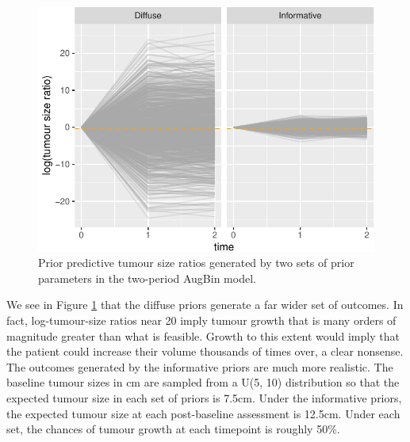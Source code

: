 \documentclass[article]{jss}
\begin{document}
\begin{CodeChunk}
\begin{figure}

{\centering \includegraphics{trialr_files/figure-latex/augbin_prior_pred_tumour-1} 

}

\caption[Prior predictive tumour size ratios generated by two sets of prior parameters in the two-period AugBin model]{Prior predictive tumour size ratios generated by two sets of prior parameters in the two-period AugBin model.}\label{fig:augbin_prior_pred_tumour}
\end{figure}
\end{CodeChunk}

We see in Figure \ref{fig:augbin_prior_pred_tumour} that the diffuse
priors generate a far wider set of outcomes. In fact, log-tumour-size
ratios near 20 imply tumour growth that is many orders of magnitude
greater than what is feasible. Growth to this extent would imply that
the patient could increase their volume thousands of times over, a clear
nonsense. The outcomes generated by the informative priors are much more
realistic. The baseline tumour sizes in cm are sampled from a U(5, 10)
distribution so that the expected tumour size in each set of priors is
7.5cm. Under the informative priors, the expected tumour size at each
post-baseline assessment is 12.5cm. Under each set, the chances of
tumour growth at each timepoint is roughly 50\%.
\end{document}
